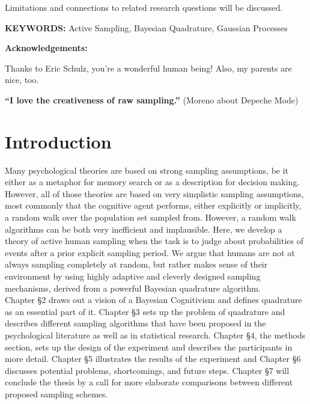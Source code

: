 \documentclass[oneside, 11pt]{book}
\begin{document}
Limitations and connections to related research questions will be discussed.\bigskip\\
\begin{center}
\textbf{KEYWORDS:} Active Sampling, Bayesian Quadrature, Gaussian Processes
\end{center}
\newpage
\vspace*{1cm}
\begin{center}
\textbf{{\LARGE Acknowledgements:}}\\
\end{center}
Thanks to Eric Schulz, you're a wonderful human being! Also, my parents are nice, too.
\newpage
\vspace*{10cm}
\begin{center}
\textbf{\Large{``I love the creativeness of raw sampling.''}} (Moreno about Depeche Mode)
\end{center}
\newpage
\tableofcontents
\newpage
\chapter{Introduction}
Many psychological theories are based on strong sampling assumptions, be it either as a metaphor for memory search or as a description for decision making. However, all of those theories are based on very simplistic sampling assumptions, most commonly that the cognitive agent performs, either explicitly or implicitly, a random walk over the population set sampled from. However, a random walk algorithms can be both very inefficient and implausible. Here, we develop a theory of active human sampling when the task is to judge about probabilities of events after a prior explicit sampling period. We argue that humans are not at always sampling completely at random, but rather makes sense of their environment by using highly adaptive and cleverly designed sampling mechanisms, derived from a powerful Bayesian quadrature algorithm.\medskip\\
Chapter \S2 draws out a vision of a Bayesian Cognitivism and defines quadrature as an essential part of it. Chapter \S3 sets up the problem of quadrature and describes different sampling algorithms that have been proposed in the psychological literature as well as in statistical research. Chapter \S4, the methods section, sets up the design of the experiment and describes the participants in more detail. Chapter \S5 illustrates the results of the experiment and Chapter \S6 discusses potential problems, shortcomings, and future steps. Chapter \S7 will conclude the thesis by a call for more elaborate comparisons between different proposed sampling schemes.
\end{document}
